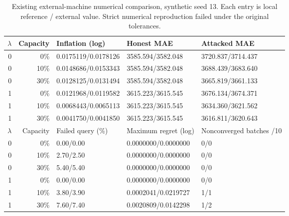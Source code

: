 \begin{table}[htbp]
\centering\small
\caption{Existing external-machine numerical comparison, synthetic seed 13. Each entry is local reference / external value. Strict numerical reproduction failed under the original tolerances.}
\label{tab:external-numerical}
\begin{tabular}{rrlll}
\toprule $\lambda$ & Capacity & Inflation (log) & Honest MAE & Attacked MAE\\\midrule
0 & 0\% & 0.0175119/0.0178126 & 3585.594/3582.048 & 3720.837/3714.437\\
0 & 10\% & 0.0148686/0.0153343 & 3585.594/3582.048 & 3688.439/3683.640\\
0 & 30\% & 0.0128125/0.0131494 & 3585.594/3582.048 & 3665.819/3661.133\\
1 & 0\% & 0.0121968/0.0119582 & 3615.223/3615.545 & 3676.134/3674.371\\
1 & 10\% & 0.0068443/0.0065113 & 3615.223/3615.545 & 3634.360/3621.562\\
1 & 30\% & 0.0041750/0.0041850 & 3615.223/3615.545 & 3616.811/3620.643\\
\midrule $\lambda$ & Capacity & Failed query (\%) & Maximum regret (log) & Nonconverged batches /10\\\midrule
0 & 0\% & 0.00/0.00 & 0.0000000/0.0000000 & 0/0\\
0 & 10\% & 2.70/2.50 & 0.0000000/0.0000000 & 0/0\\
0 & 30\% & 5.40/5.40 & 0.0000000/0.0000000 & 0/0\\
1 & 0\% & 0.00/0.00 & 0.0000000/0.0000000 & 0/0\\
1 & 10\% & 3.80/3.90 & 0.0002041/0.0219727 & 1/1\\
1 & 30\% & 7.60/7.40 & 0.0020809/0.0142298 & 1/2\\
\bottomrule\end{tabular}
\end{table}
